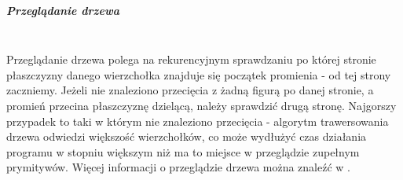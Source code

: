 \subparagraph{Przeglądanie drzewa}\mbox{} \\


Przeglądanie drzewa polega na rekurencyjnym sprawdzaniu po której stronie płaszczyzny danego wierzchołka znajduje się początek promienia - od tej strony zaczniemy. Jeżeli nie znaleziono przecięcia z żadną figurą po danej stronie, a promień przecina płaszczyznę dzielącą, należy sprawdzić drugą stronę. Najgorszy przypadek to taki w którym nie znaleziono przecięcia - algorytm trawersowania drzewa odwiedzi większość wierzchołków, co może wydłużyć czas działania programu w stopniu większym niż ma to miejsce w przeglądzie zupełnym prymitywów. Więcej informacji o przeglądzie drzewa można znaleźć w \cite{bspfaq, trees}.